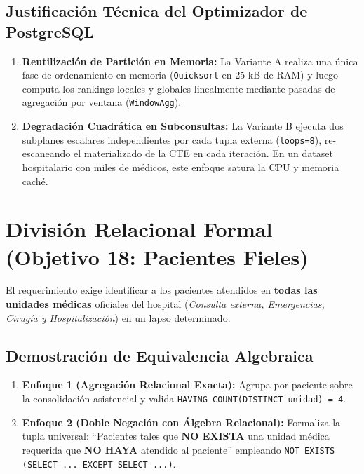 \documentclass[11pt,a4paper]{article}
\begin{document}
\subsection{Justificación Técnica del Optimizador de PostgreSQL}
\begin{enumerate}
	\item \textbf{Reutilización de Partición en Memoria:} La Variante A realiza una única fase de ordenamiento en memoria (\texttt{Quicksort} en 25 kB de RAM) y luego computa los rankings locales y globales linealmente mediante pasadas de agregación por ventana (\texttt{WindowAgg}).
	\item \textbf{Degradación Cuadrática en Subconsultas:} La Variante B ejecuta dos subplanes escalares independientes por cada tupla externa (\texttt{loops=8}), re-escaneando el materializado de la CTE en cada iteración. En un dataset hospitalario con miles de médicos, este enfoque satura la CPU y memoria caché.
\end{enumerate}

\newpage

\section{División Relacional Formal (Objetivo 18: Pacientes Fieles)}
El requerimiento exige identificar a los pacientes atendidos en \textbf{todas las unidades médicas} oficiales del hospital (\textit{Consulta externa, Emergencias, Cirugía y Hospitalización}) en un lapso determinado.

\subsection{Demostración de Equivalencia Algebraica}
\begin{enumerate}
	\item \textbf{Enfoque 1 (Agregación Relacional Exacta):} Agrupa por paciente sobre la consolidación asistencial y valida \texttt{HAVING COUNT(DISTINCT unidad) = 4}.
	\item \textbf{Enfoque 2 (Doble Negación con Álgebra Relacional):} Formaliza la tupla universal: ``Pacientes tales que \textbf{NO EXISTA} una unidad médica requerida que \textbf{NO HAYA} atendido al paciente'' empleando \texttt{NOT EXISTS (SELECT ... EXCEPT SELECT ...)}.
\end{enumerate}
\end{document}
